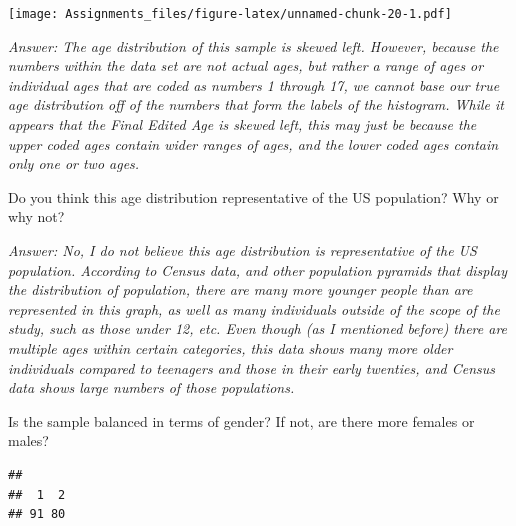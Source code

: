 \documentclass[
]{article}
\newenvironment{Shaded}{\begin{snugshade}}{\end{snugshade}}
\newcommand{\AttributeTok}[1]{\textcolor[rgb]{0.77,0.63,0.00}{#1}}
\newcommand{\FunctionTok}[1]{\textcolor[rgb]{0.00,0.00,0.00}{#1}}
\newcommand{\NormalTok}[1]{#1}
\newcommand{\OtherTok}[1]{\textcolor[rgb]{0.56,0.35,0.01}{#1}}
\newcommand{\SpecialCharTok}[1]{\textcolor[rgb]{0.00,0.00,0.00}{#1}}
\newcommand{\StringTok}[1]{\textcolor[rgb]{0.31,0.60,0.02}{#1}}
\begin{document}
\begin{Shaded}
\end{Shaded}

\texttt{[image: Assignments\_files/figure-latex/unnamed-chunk-20-1.pdf]}

\emph{Answer: The age distribution of this sample is skewed left.
However, because the numbers within the data set are not actual ages,
but rather a range of ages or individual ages that are coded as numbers
1 through 17, we cannot base our true age distribution off of the
numbers that form the labels of the histogram. While it appears that the
Final Edited Age is skewed left, this may just be because the upper
coded ages contain wider ranges of ages, and the lower coded ages
contain only one or two ages.}

Do you think this age distribution representative of the US population?
Why or why not?

\emph{Answer: No, I do not believe this age distribution is
representative of the US population. According to Census data, and other
population pyramids that display the distribution of population, there
are many more younger people than are represented in this graph, as well
as many individuals outside of the scope of the study, such as those
under 12, etc. Even though (as I mentioned before) there are multiple
ages within certain categories, this data shows many more older
individuals compared to teenagers and those in their early twenties, and
Census data shows large numbers of those populations.}

Is the sample balanced in terms of gender? If not, are there more
females or males?

\begin{Shaded}
\end{Shaded}

\begin{verbatim}
## 
##  1  2 
## 91 80
\end{verbatim}
\end{document}
